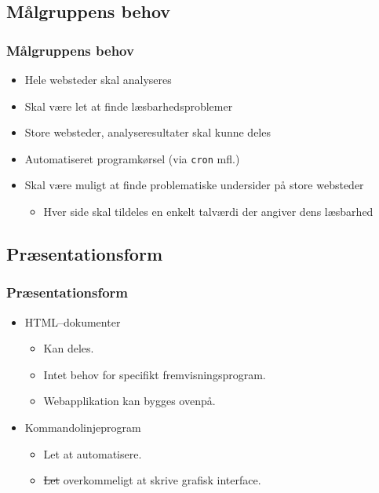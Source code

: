 \documentclass{beamer}
\begin{document}
\subsection{Målgruppens behov}
\begin{frame}
  \frametitle{Målgruppens behov}
  \begin{itemize}
  \item<1-> Hele websteder skal analyseres
  \item<2-> Skal være let at finde læsbarhedsproblemer
  \item<3-> Store websteder, analyseresultater skal kunne deles
  \item<4-> Automatiseret programkørsel (via \texttt{cron} mfl.)
  \item<5-> Skal være muligt at finde problematiske undersider på store websteder
    \begin{itemize}
    \item<6-> Hver side skal tildeles en enkelt talværdi der angiver dens læsbarhed
    \end{itemize}    
  \end{itemize}
\end{frame}

\subsection{Præsentationsform}
\begin{frame}
  \frametitle{Præsentationsform}
  \begin{itemize}
    \item<1->HTML--dokumenter
      \begin{itemize}
      \item<1-> Kan deles.
      \item<2-> Intet behov for specifikt fremvisningsprogram.
      \item<3-> Webapplikation kan bygges ovenpå.
      \end{itemize}  

    \item<4->Kommandolinjeprogram
      \begin{itemize}
      \item<4-> Let at automatisere.
      \item<5-> \st{Let} overkommeligt at skrive grafisk interface.
      \end{itemize}  
    \end{itemize}
\end{frame}
\end{document}
